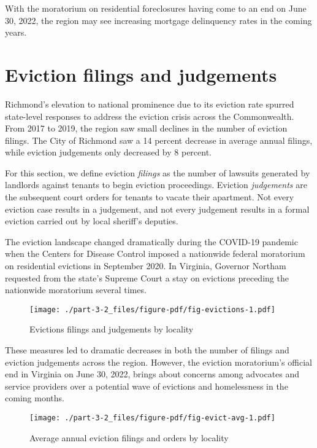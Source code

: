 \documentclass[
  letterpaper,
  DIV=11,
  numbers=noendperiod]{scrreprt}
\begin{document}
With the moratorium on residential foreclosures having come to an end on
June 30, 2022, the region may see increasing mortgage delinquency rates
in the coming years.

\hypertarget{eviction-filings-and-judgements}{%
\section{Eviction filings and
judgements}\label{eviction-filings-and-judgements}}

Richmond's elevation to national prominence due to its eviction rate
spurred state-level responses to address the eviction crisis across the
Commonwealth. From 2017 to 2019, the region saw small declines in the
number of eviction filings. The City of Richmond saw a 14 percent
decrease in average annual filings, while eviction judgements only
decreased by 8 percent.

For this section, we define eviction \emph{filings} as the number of
lawsuits generated by landlords against tenants to begin eviction
proceedings. Eviction \emph{judgements} are the subsequent court orders
for tenants to vacate their apartment. Not every eviction case results
in a judgement, and not every judgement results in a formal eviction
carried out by local sheriff's deputies.

The eviction landscape changed dramatically during the COVID-19 pandemic
when the Centers for Disease Control imposed a nationwide federal
moratorium on residential evictions in September 2020. In Virginia,
Governor Northam requested from the state's Supreme Court a stay on
evictions preceding the nationwide moratorium several times.

\begin{figure}

{\centering \texttt{[image: ./part-3-2\_files/figure-pdf/fig-evictions-1.pdf]}

}

\caption{\label{fig-evictions}Evictions filings and judgements by
locality}

\end{figure}

These measures led to dramatic decreases in both the number of filings
and eviction judgements across the region. However, the eviction
moratorium's official end in Virginia on June 30, 2022, brings about
concerns among advocates and service providers over a potential wave of
evictions and homelessness in the coming months.

\begin{figure}

{\centering \texttt{[image: ./part-3-2\_files/figure-pdf/fig-evict-avg-1.pdf]}

}

\caption{\label{fig-evict-avg}Average annual eviction filings and orders
by locality}

\end{figure}
\end{document}
